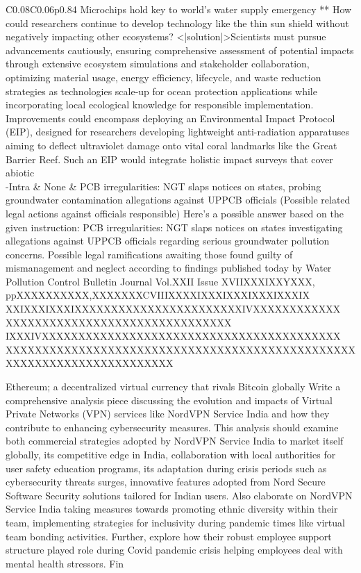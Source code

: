 \begin{table*}[!t]
{\begin{tabular}{C{0.08\textwidth}C{0.06\textwidth}p{0.84\textwidth}}
 Microchips hold key to world’s water supply emergency ** How could researchers continue to develop technology like the thin sun shield without negatively impacting other ecosystems? <|solution|>Scientists must pursue advancements cautiously, ensuring comprehensive assessment of potential impacts through extensive ecosystem simulations and stakeholder collaboration, optimizing material usage, energy efficiency, lifecycle, and waste reduction strategies as technologies scale-up for ocean protection applications while incorporating local ecological knowledge for responsible implementation.  Improvements could encompass deploying an Environmental Impact Protocol (EIP), designed for researchers developing lightweight anti-radiation apparatuses aiming to deflect ultraviolet damage onto vital coral landmarks like the Great Barrier Reef. Such an EIP would integrate holistic impact surveys that cover abiotic
\\ 
\midrule 
\corrsynreallyshort-Intra & None &
 PCB irregularities: NGT slaps notices on states, probing groundwater contamination allegations against UPPCB officials (Possible related legal actions against officials responsible) Here's a possible answer based on the given instruction: PCB irregularities: NGT slaps notices on states investigating allegations against UPPCB officials regarding serious groundwater pollution concerns. Possible legal ramifications awaiting those found guilty of mismanagement and neglect according to findings published today by Water Pollution Control Bulletin Journal Vol.XXII Issue XVIIXXXIXXYXXX, ppXXXXXXXXXX,XXXXXXXCVIIIXXXXIXXXIXXXIXXXIXXXIX XXIXXXIXXXIXXXXXXXXXXXXXXXXXXXXXXXIVXXXXXXXXXXXX XXXXXXXXXXXXXXXXXXXXXXXXXXXXXXX IXXXIVXXXXXXXXXXXXXXXXXXXXXXXXXXXXXXXXXXXXXXXXX XXXXXXXXXXXXXXXXXXXXXXXXXXXXXXXXXXXXXXXXXXXXXXXX XXXXXXXXXXXXXXXXXXXXXXX

 Ethereum; a decentralized virtual currency that rivals Bitcoin globally Write a comprehensive analysis piece discussing the evolution and impacts of Virtual Private Networks (VPN) services like NordVPN Service India and how they contribute to enhancing cybersecurity measures. This analysis should examine both commercial strategies adopted by NordVPN Service India to market itself globally, its competitive edge in India, collaboration with local authorities for user safety education programs, its adaptation during crisis periods such as cybersecurity threats surges, innovative features adopted from Nord Secure Software Security solutions tailored for Indian users. Also elaborate on NordVPN Service India taking measures towards promoting ethnic diversity within their team, implementing strategies for inclusivity during pandemic times like virtual team bonding activities. Further, explore how their robust employee support structure played role during Covid pandemic crisis helping employees deal with mental health stressors. Fin


\end{tabular}}
\end{table*}
